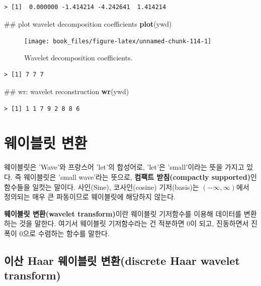 \documentclass[b5paper,]{scrbook}
\makeatletter
\newenvironment{Shaded}{\begin{snugshade}}{\end{snugshade}}
\newcommand{\KeywordTok}[1]{\textcolor[rgb]{0.13,0.29,0.53}{\textbf{{#1}}}}
\newcommand{\NormalTok}[1]{{#1}}
\theoremstyle{plain}
\theoremstyle{definition}
\numberwithin{equation}{section}
\newenvironment{kframe}{%
\medskip{}
\setlength{\fboxsep}{.8em}
 \def\at@end@of@kframe{}%
 \ifinner\ifhmode%
  \def\at@end@of@kframe{\end{minipage}}%
  \begin{minipage}{\columnwidth}%
 \fi\fi%
 \def\FrameCommand##1{\hskip\@totalleftmargin \hskip-\fboxsep
 \colorbox{shadecolor}{##1}\hskip-\fboxsep
     \hskip-\linewidth \hskip-\@totalleftmargin \hskip\columnwidth}%
 \MakeFramed {\advance\hsize-\width
   \@totalleftmargin\z@ \linewidth\hsize
   \@setminipage}}%
 {\par\unskip\endMakeFramed%
 \at@end@of@kframe}
\renewenvironment{Shaded}{\begin{kframe}}{\end{kframe}}
\makeatother
\begin{document}
\begin{verbatim}
> [1]  0.000000 -1.414214 -4.242641  1.414214
\end{verbatim}

\begin{Shaded}
\begin{Highlighting}[]
\NormalTok{## plot wavelet decomposition coefficients}
\KeywordTok{plot}\NormalTok{(ywd)}
\end{Highlighting}
\end{Shaded}

\begin{figure}

{\centering \texttt{[image: book\_files/figure-latex/unnamed-chunk-114-1]} 

}

\caption{Wavelet decomposition coefficients.}\label{fig:unnamed-chunk-114}
\end{figure}

\begin{verbatim}
> [1] 7 7 7
\end{verbatim}

\begin{Shaded}
\begin{Highlighting}[]
\NormalTok{## wr: wavelet reconstruction}
\KeywordTok{wr}\NormalTok{(ywd)}
\end{Highlighting}
\end{Shaded}

\begin{verbatim}
> [1] 1 1 7 9 2 8 8 6
\end{verbatim}

\chapter{웨이블릿 변환}\label{wavelettransform}

웨이블릿은 'Wave'와 프랑스어 'let'의 합성어로, 'let'은 'small'이라는
뜻을 가지고 있다. 즉 웨이블릿은 'small wave'라는 뜻으로, \textbf{컴팩트
받침(compactly supported)}인 함수들을 일컷는 말이다. 사인(Sine),
코사인(cosine) 기저(basis)는 \((-\infty, \infty)\)에서 정의되는 매우 큰
파동이므로 웨이블릿에 해당하지 않는다.

\textbf{웨이블릿 변환(wavelet transform)}이란 웨이블릿 기저함수를 이용해
데이터를 변환하는 것을 말한다. 여기서 웨이블릿 기저함수라는 건 적분하면
0이 되고, 진동하면서 진폭이 0으로 수렴하는 함수를 말한다.

\section{이산 Haar 웨이블릿 변환(discrete Haar wavelet
transform)}\label{-haar--discrete-haar-wavelet-transform}
\end{document}
